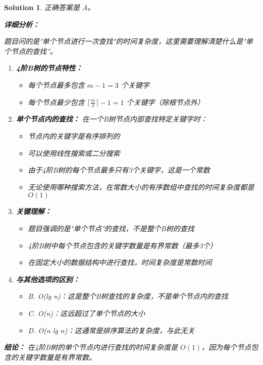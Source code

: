 \documentclass[UTF8]{report}
\newtheorem{solution}{Solution}
\theoremstyle{MyLineTheoremStyle} %
\theoremstyle{MyBlockTheoremStyle} %
\theoremstyle{MySubsubsectionStyle} %
\begin{document}
\begin{solution}
正确答案是 A。

\textbf{详细分析：}

题目问的是"单个节点进行一次查找"的时间复杂度，这里需要理解清楚什么是"单个节点的查找”。

\begin{enumerate}
    \item \textbf{4阶B树的节点特性：}
    \begin{itemize}
        \item 每个节点最多包含 $m-1 = 3$ 个关键字
        \item 每个节点最少包含 $\lceil \frac{m}{2} \rceil - 1 = 1$ 个关键字（除根节点外）
    \end{itemize}

    \item \textbf{单个节点内的查找：}
    在一个B树节点内部查找特定关键字时：
    \begin{itemize}
        \item 节点内的关键字是有序排列的
        \item 可以使用线性搜索或二分搜索
        \item 由于4阶B树的每个节点最多只有3个关键字，这是一个常数
        \item 无论使用哪种搜索方法，在常数大小的有序数组中查找的时间复杂度都是 $O(1)$
    \end{itemize}

    \item \textbf{关键理解：}
    \begin{itemize}
        \item 题目强调的是"单个节点"的查找，不是整个B树的查找
        \item 4阶B树中每个节点包含的关键字数量是有界常数（最多3个）
        \item 在固定大小的数据结构中进行查找，时间复杂度是常数时间
    \end{itemize}

    \item \textbf{与其他选项的区别：}
    \begin{itemize}
        \item B. O(lg n)：这是整个B树查找的复杂度，不是单个节点内的查找
        \item C. O(n)：这远超过了单个节点的大小
        \item D. O(n lg n)：这通常是排序算法的复杂度，与此无关
    \end{itemize}
\end{enumerate}

\textbf{结论：}
在4阶B树的单个节点内进行查找的时间复杂度是 $O(1)$，因为每个节点包含的关键字数量是有界常数。
\end{solution}
\end{document}
